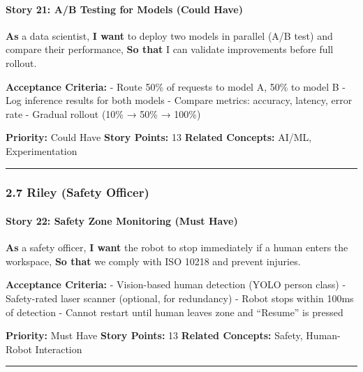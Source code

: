 \documentclass[
]{article}
\begin{document}
\hypertarget{story-21-ab-testing-for-models-could-have}{%
\paragraph{Story 21: A/B Testing for Models (Could
Have)}\label{story-21-ab-testing-for-models-could-have}}

\textbf{As} a data scientist, \textbf{I want} to deploy two models in
parallel (A/B test) and compare their performance, \textbf{So that} I
can validate improvements before full rollout.

\textbf{Acceptance Criteria:} - Route 50\% of requests to model A, 50\%
to model B - Log inference results for both models - Compare metrics:
accuracy, latency, error rate - Gradual rollout (10\% → 50\% → 100\%)

\textbf{Priority:} Could Have \textbf{Story Points:} 13 \textbf{Related
Concepts:} AI/ML, Experimentation

\begin{center}\rule{0.5\linewidth}{0.5pt}\end{center}

\hypertarget{riley-safety-officer}{%
\subsubsection{2.7 Riley (Safety Officer)}\label{riley-safety-officer}}

\hypertarget{story-22-safety-zone-monitoring-must-have}{%
\paragraph{Story 22: Safety Zone Monitoring (Must
Have)}\label{story-22-safety-zone-monitoring-must-have}}

\textbf{As} a safety officer, \textbf{I want} the robot to stop
immediately if a human enters the workspace, \textbf{So that} we comply
with ISO 10218 and prevent injuries.

\textbf{Acceptance Criteria:} - Vision-based human detection (YOLO
person class) - Safety-rated laser scanner (optional, for redundancy) -
Robot stops within 100ms of detection - Cannot restart until human
leaves zone and ``Resume'' is pressed

\textbf{Priority:} Must Have \textbf{Story Points:} 13 \textbf{Related
Concepts:} Safety, Human-Robot Interaction

\begin{center}\rule{0.5\linewidth}{0.5pt}\end{center}
\end{document}
